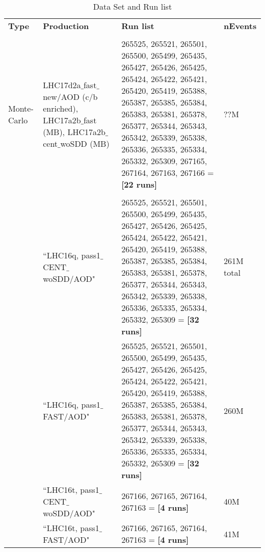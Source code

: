 \begin{table}[h]
\begin{tabular}{ p{1.2cm} | p{4.2cm} |  p{7cm} |  p{1.2cm}}
{\normalsize \textbf {Type}} &       {\normalsize \textbf {Production}} &       {\normalsize \textbf {Run list}} & {\normalsize \textbf {nEvents}} \\
\\ \hline
Monte-Carlo & LHC17d2a$\_$fast$\_$new/AOD (c/b enriched), LHC17a2b$\_$fast (MB), LHC17a2b$\_$cent$\_$woSDD (MB) &265525, 265521, 265501, 265500, 265499, 265435, 265427, 265426, 265425, 265424, 265422, 265421, 265420, 265419, 265388, 265387, 265385, 265384, 265383, 265381, 265378, 265377, 265344, 265343, 265342, 265339, 265338, 265336, 265335, 265334, 265332, 265309, 267165, 267164, 267163, 267166 = \textbf{[22 runs]} & ??M\\
\\ \hline

\multirow{7}{*}{} Data&``LHC16q, pass1$\_$CENT$\_$woSDD/AOD" & 265525, 265521, 265501, 265500, 265499, 265435, 265427, 265426, 265425, 265424, 265422, 265421, 265420, 265419, 265388, 265387, 265385, 265384, 265383, 265381, 265378, 265377, 265344, 265343, 265342, 265339, 265338, 265336, 265335, 265334, 265332, 265309 = \textbf{[32 runs]}& 261M total\\
                  &``LHC16q, pass1$\_$FAST/AOD" &265525, 265521, 265501, 265500, 265499, 265435, 265427, 265426, 265425, 265424, 265422, 265421, 265420, 265419, 265388, 265387, 265385, 265384, 265383, 265381, 265378, 265377, 265344, 265343, 265342, 265339, 265338, 265336, 265335, 265334, 265332, 265309 = \textbf{[32 runs]} & 260M \\
 & ``LHC16t, pass1$\_$CENT$\_$woSDD/AOD" & 267166, 267165, 267164, 267163 = \textbf{[4 runs]} & 40M \\
  & ``LHC16t, pass1$\_$FAST/AOD" & 267166, 267165, 267164, 267163 = \textbf{[4 runs]} & 41M \\
 \hline \hline
\end{tabular}
\\
\caption {Data Set and Run list}
\end{table} 